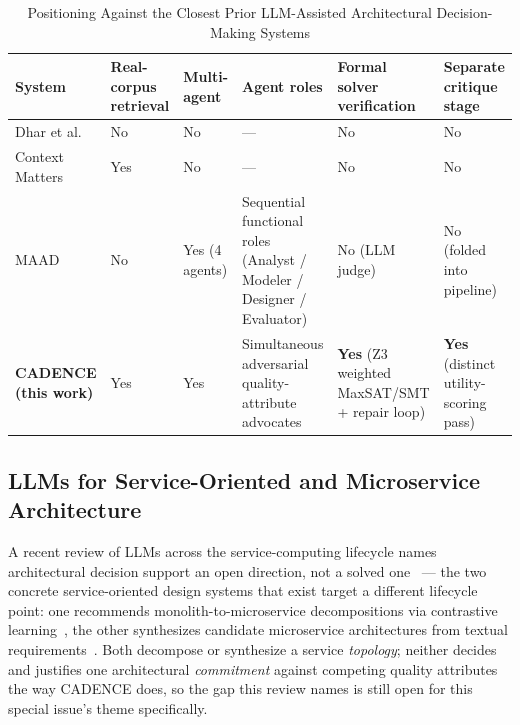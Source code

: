 \documentclass[lettersize,journal]{IEEEtran}
\begin{document}
\begin{table}[t]
\caption{Positioning Against the Closest Prior LLM-Assisted Architectural Decision-Making Systems\label{tab:relatedwork}}
\centering
\footnotesize
\setlength{\tabcolsep}{3pt}
\begin{tabular}{@{}
  >{\raggedright\arraybackslash}p{1.05in}
  >{\centering\arraybackslash}p{0.5in}
  >{\centering\arraybackslash}p{0.5in}
  >{\raggedright\arraybackslash}p{1.65in}
  >{\raggedright\arraybackslash}p{1.35in}
  >{\raggedright\arraybackslash}p{1.15in}
@{}}
\toprule
System & Real-corpus retrieval & Multi-agent & Agent roles & Formal solver verification & Separate critique stage \\
\midrule
Dhar et al.~\cite{dhar2024llm}            & No  & No             & ---                                                                    & No             & No \\
Context Matters~\cite{contextmatters2026} & Yes & No             & ---                                                                    & No             & No \\
MAAD~\cite{maad2025}                      & No  & Yes (4 agents) & Sequential functional roles (Analyst / Modeler / Designer / Evaluator) & No (LLM judge) & No (folded into pipeline) \\
\textbf{CADENCE (this work)}              & Yes & Yes            & Simultaneous adversarial quality-attribute advocates                  & \textbf{Yes} (Z3 weighted MaxSAT/SMT + repair loop) & \textbf{Yes} (distinct utility-scoring pass) \\
\bottomrule
\end{tabular}
\end{table}

\subsection{LLMs for Service-Oriented and Microservice Architecture}

A recent review of LLMs across the service-computing lifecycle names architectural decision support an open direction, not a solved one~\cite{kumara2026llm4soc} --- the two concrete service-oriented design systems that exist target a different lifecycle point: one recommends monolith-to-microservice decompositions via contrastive learning~\cite{sellami2025microservice}, the other synthesizes candidate microservice architectures from textual requirements~\cite{albuquerque2026microservice}. Both decompose or synthesize a service \emph{topology}; neither decides and justifies one architectural \emph{commitment} against competing quality attributes the way CADENCE does, so the gap this review names is still open for this special issue's theme specifically.
\end{document}
